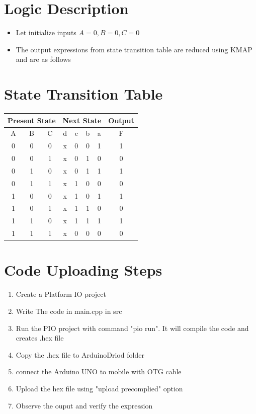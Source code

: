 \documentclass[a4paper,12pt]{article}                           \usepackage{amsmath, amssymb}
\begin{document}
\section*{Logic Description}
\begin{itemize}
	\item Let initialize inputs $A=0,B=0,C=0$
	\item The output expressions from state transition table are reduced using KMAP and are as follows
\end{itemize}
\section*{State Transition Table}
\begin{center}
\begin{tabular}{|c|c|c|c|c|c|c|c|}
\hline
	\multicolumn{3}{|c|}{\textbf{Present State}} & \multicolumn{4}{|c|}{\textbf{Next State}} & \textbf{Output} \\ \hline
	A & B & C & d & c & b & a & F\\ \hline
	0 & 0 & 0 & x & 0 & 0 & 1 & 1\\
	0 & 0 & 1 & x & 0 & 1 & 0 & 0\\
	0 & 1 & 0 & x & 0 & 1 & 1 & 1\\
	0 & 1 & 1 & x & 1 & 0 & 0 & 0\\
	1 & 0 & 0 & x & 1 & 0 & 1 & 1\\
	1 & 0 & 1 & x & 1 & 1 & 0 & 0\\
	1 & 1 & 0 & x & 1 & 1 & 1 & 1\\
	1 & 1 & 1 & x & 0 & 0 & 0 & 0\\ \hline
\end{tabular}
\end{center}
\section*{Code Uploading Steps}
\begin{enumerate}
	\item Create a Platform IO project
	\item Write The code in main.cpp in src
	\item Run the PIO project with command "pio run". It will compile the code and creates .hex file
	\item Copy the .hex file to ArduinoDriod folder
	\item connect the Arduino UNO to mobile with OTG cable
	\item Upload the hex file using "upload precomplied" option
	\item Observe the ouput and verify the expression
\end{enumerate}
\end{document}
